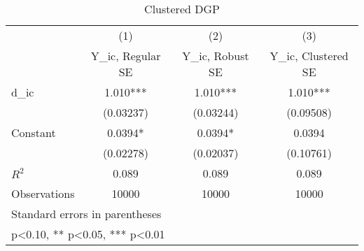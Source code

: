 \begin{table}[htbp]\centering
\def\sym#1{\ifmmode^{#1}\else\(^{#1}\)\fi}
\caption{Clustered DGP}
\begin{tabular}{l*{3}{c}}
\toprule
                    &\multicolumn{1}{c}{(1)}&\multicolumn{1}{c}{(2)}&\multicolumn{1}{c}{(3)}\\
                    &\multicolumn{1}{c}{Y\_ic, Regular SE}&\multicolumn{1}{c}{Y\_ic, Robust SE}&\multicolumn{1}{c}{Y\_ic, Clustered SE}\\
\midrule
d\_ic                &       1.010***&       1.010***&       1.010***\\
                    &   (0.03237)   &   (0.03244)   &   (0.09508)   \\
\addlinespace
Constant            &      0.0394*  &      0.0394*  &      0.0394   \\
                    &   (0.02278)   &   (0.02037)   &   (0.10761)   \\
\midrule
\(R^{2}\)           &       0.089   &       0.089   &       0.089   \\
Observations        &       10000   &       10000   &       10000   \\
\bottomrule
\multicolumn{4}{l}{\footnotesize Standard errors in parentheses}\\
\multicolumn{4}{l}{\footnotesize * p<0.10, ** p<0.05, *** p<0.01}\\
\end{tabular}
\end{table}
